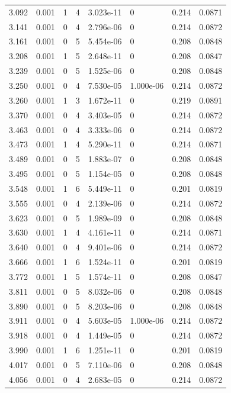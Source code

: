 \documentclass[preview]{standalone}
\begin{document}
{{{\begin{tabular}{L{1.2cm}C{1.2cm} C{0.3cm}C{0.5cm} C{1.4cm}C{1.4cm} C{1.4cm}C{1.4cm}}
  3.092  &  0.001  & 1     &  4 &  3.023e-11  & 0  & 0.214 &  0.0871   \\ 
  3.141  &  0.001  & 0     &  4 &  2.796e-06  & 0  & 0.214 &  0.0872   \\ 
  3.161  &  0.001  & 0     &  5 &  5.454e-06  & 0  & 0.208 &  0.0848   \\ 
  3.208  &  0.001  & 1     &  5 &  2.648e-11  & 0  & 0.208 &  0.0847   \\ 
  3.239  &  0.001  & 0     &  5 &  1.525e-06  & 0  & 0.208 &  0.0848   \\ 
  3.250  &  0.001  & 0     &  4 &  7.530e-05  & 1.000e-06  & 0.214 &  0.0872   \\ 
  3.260  &  0.001  & 1     &  3 &  1.672e-11  & 0  & 0.219 &  0.0891   \\ 
  3.370  &  0.001  & 0     &  4 &  3.403e-05  & 0  & 0.214 &  0.0872   \\ 
  3.463  &  0.001  & 0     &  4 &  3.333e-06  & 0  & 0.214 &  0.0872   \\ 
  3.473  &  0.001  & 1     &  4 &  5.290e-11  & 0  & 0.214 &  0.0871   \\ 
  3.489  &  0.001  & 0     &  5 &  1.883e-07  & 0  & 0.208 &  0.0848   \\ 
  3.495  &  0.001  & 0     &  5 &  1.154e-05  & 0  & 0.208 &  0.0848   \\ 
  3.548  &  0.001  & 1     &  6 &  5.449e-11  & 0  & 0.201 &  0.0819   \\ 
  3.555  &  0.001  & 0     &  4 &  2.139e-06  & 0  & 0.214 &  0.0872   \\ 
  3.623  &  0.001  & 0     &  5 &  1.989e-09  & 0  & 0.208 &  0.0848   \\ 
  3.630  &  0.001  & 1     &  4 &  4.161e-11  & 0  & 0.214 &  0.0871   \\ 
  3.640  &  0.001  & 0     &  4 &  9.401e-06  & 0  & 0.214 &  0.0872   \\ 
  3.666  &  0.001  & 1     &  6 &  1.524e-11  & 0  & 0.201 &  0.0819   \\ 
  3.772  &  0.001  & 1     &  5 &  1.574e-11  & 0  & 0.208 &  0.0847   \\ 
  3.811  &  0.001  & 0     &  5 &  8.032e-06  & 0  & 0.208 &  0.0848   \\ 
  3.890  &  0.001  & 0     &  5 &  8.203e-06  & 0  & 0.208 &  0.0848   \\ 
  3.911  &  0.001  & 0     &  4 &  5.603e-05  & 1.000e-06  & 0.214 &  0.0872   \\ 
  3.918  &  0.001  & 0     &  4 &  1.449e-05  & 0  & 0.214 &  0.0872   \\ 
  3.990  &  0.001  & 1     &  6 &  1.251e-11  & 0  & 0.201 &  0.0819   \\ 
  4.017  &  0.001  & 0     &  5 &  7.110e-06  & 0  & 0.208 &  0.0848   \\ 
  4.056  &  0.001  & 0     &  4 &  2.683e-05  & 0  & 0.214 &  0.0872   \\ 
\hline 
\end{tabular} 

}}}
\end{document}
